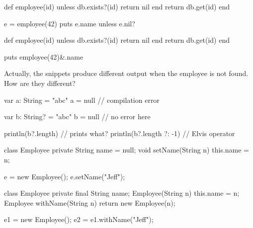 \documentclass{article}
\begin{document}
\begin{pptWide}{2}
{\small\begin{ffcode}
def employee(id)
  unless db.exists?(id)
    return nil
  end
  return db.get(id)
end

e = employee(42)
puts e.name unless e.nil?
\end{ffcode}
}
\par\columnbreak\par
{\small\begin{ffcode}
def employee(id)
  unless db.exists?(id)
    return nil
  end
  return db.get(id)
end

puts employee(42)&.name
\end{ffcode}
}
\end{pptWide}
\par
Actually, the snippets produce different output when the employee is not found. How are they different?
\plush{}

{\small\begin{ffcode}
var a: String = "abc"
a = null // compilation error

var b: String? = "abc"
b = null // no error here

println(b?.length) // prints what?
println(b?.length ?: -1) // Elvis operator
\end{ffcode}
}
\plush{}


\begin{pptWide}{2}
{\small\begin{ffcode}
class Employee {
  private String name = null;
  void setName(String n) {
    this.name = n;
  }
}

e = new Employee();
e.setName("Jeff");
\end{ffcode}
}
\par\columnbreak\par
{\small\begin{ffcode}
class Employee {
  private final String name;
  Employee(String n) {
    this.name = n;
  }
  Employee withName(String n) {
    return new Employee(n);
  }
}

e1 = new Employee();
e2 = e1.withName("Jeff");
\end{ffcode}
}
\end{pptWide}
\plush{}
\end{document}
